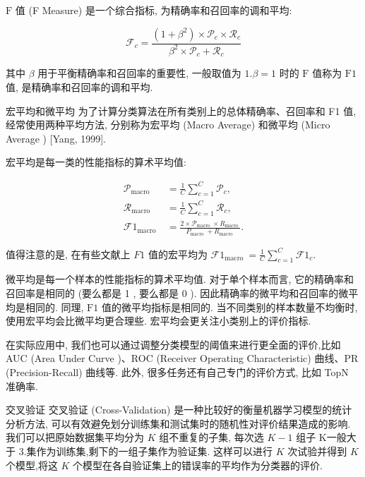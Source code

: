 \documentclass[10pt]{article}
\begin{document}
$\mathrm{F}$ 值 (F Measure) 是一个综合指标, 为精确率和召回率的调和平均:


\begin{equation*}
\mathcal{F}_{c}=\frac{\left(1+\beta^{2}\right) \times \mathcal{P}_{c} \times \mathcal{R}_{c}}{\beta^{2} \times \mathcal{P}_{c}+\mathcal{R}_{c}} \tag{2.81}
\end{equation*}


其中 $\beta$ 用于平衡精确率和召回率的重要性, 一般取值为 $1 . \beta=1$ 时的 $\mathrm{F}$ 值称为 $\mathrm{F} 1$值, 是精确率和召回率的调和平均.

宏平均和微平均 为了计算分类算法在所有类别上的总体精确率、召回率和 F1 值, 经常使用两种平均方法, 分别称为宏平均 (Macro Average) 和微平均 (Micro Average ) [Yang, 1999].

宏平均是每一类的性能指标的算术平均值:


\begin{align*}
\mathcal{P}_{\text {macro }} & =\frac{1}{C} \sum_{c=1}^{C} \mathcal{P}_{c},  \tag{2.82}\\
\mathcal{R}_{\text {macro }} & =\frac{1}{C} \sum_{c=1}^{C} \mathcal{R}_{c},  \tag{2.83}\\
\mathcal{F} 1_{\text {macro }} & =\frac{2 \times \mathcal{P}_{\text {macro }} \times R_{\text {macro }}}{P_{\text {macro }}+R_{\text {macro }}} . \tag{2.84}
\end{align*}


值得注意的是, 在有些文献上 $F 1$ 值的宏平均为 $\mathcal{F} 1_{\text {macro }}=\frac{1}{C} \sum_{c=1}^{C} \mathcal{F} 1_{c}$.

微平均是每一个样本的性能指标的算术平均值. 对于单个样本而言, 它的精确率和召回率是相同的 (要么都是 1 , 要么都是 0 ). 因此精确率的微平均和召回率的微平均是相同的. 同理, $\mathrm{F} 1$ 值的微平均指标是相同的. 当不同类别的样本数量不均衡时, 使用宏平均会比微平均更合理些. 宏平均会更关注小类别上的评价指标.

在实际应用中, 我们也可以通过调整分类模型的阈值来进行更全面的评价,比如 AUC (Area Under Curve )、ROC (Receiver Operating Characteristic) 曲线、PR (Precision-Recall) 曲线等. 此外, 很多任务还有自己专门的评价方式, 比如 TopN 准确率.

交叉验证 交叉验证 (Cross-Validation) 是一种比较好的衡量机器学习模型的统计分析方法, 可以有效避免划分训练集和测试集时的随机性对评价结果造成的影响. 我们可以把原始数据集平均分为 $K$ 组不重复的子集, 每次选 $K-1$ 组子 K一般大于 3.集作为训练集,剩下的一组子集作为验证集. 这样可以进行 $K$ 次试验并得到 $K$ 个模型,将这 $K$ 个模型在各自验证集上的错误率的平均作为分类器的评价.
\end{document}
